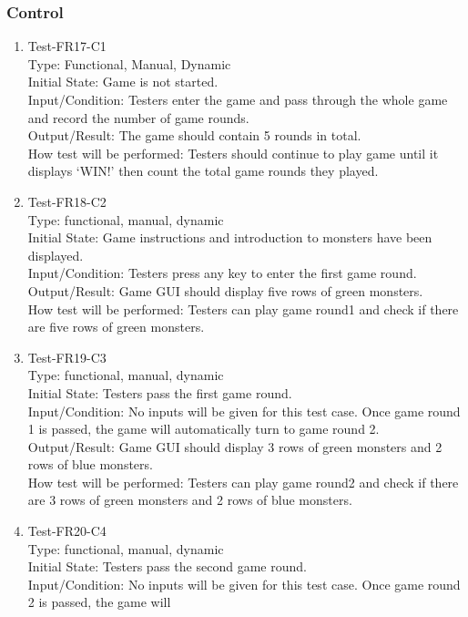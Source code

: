 \documentclass[12pt]{article}
\begin{document}
\subsubsection{Control}
\begin{enumerate}[1.]
\item Test-FR17-C1\\
Type: Functional, Manual, Dynamic\\
Initial State: Game is not started.\\
Input/Condition: Testers enter the game and pass through the whole game and record the number of game rounds.\\
Output/Result: The game should contain 5 rounds in total.\\
How test will be performed: Testers should continue to play game until it displays ‘WIN!’ then count the total game rounds they played.
\newpage
\item Test-FR18-C2\\
Type: functional, manual, dynamic\\
Initial State: Game instructions and introduction to 
monsters have been displayed.\\
Input/Condition: Testers press any
key to enter the first game round.\\
Output/Result: Game GUI should display five rows of green monsters.\\
How test will be performed: Testers can play game round1
and check if there are five rows of green monsters.
\item Test-FR19-C3\\
Type: functional, manual, dynamic\\
Initial State: Testers pass the first game round.\\
Input/Condition: No inputs will be given for this test 
case. Once game round 1 is passed, the game will
automatically turn to game round 2.\\
Output/Result: Game GUI should display 3 rows of green monsters and 2 rows of blue monsters.\\
How test will be performed: Testers can play game round2
and check if there are 3 rows of green monsters and 2
rows of blue monsters.
\item Test-FR20-C4\\
Type: functional, manual, dynamic\\
Initial State: Testers pass the second game round.\\
Input/Condition: No inputs will be given for this test 
case. Once game round 2 is passed, the game will

\end{enumerate}
\end{document}
